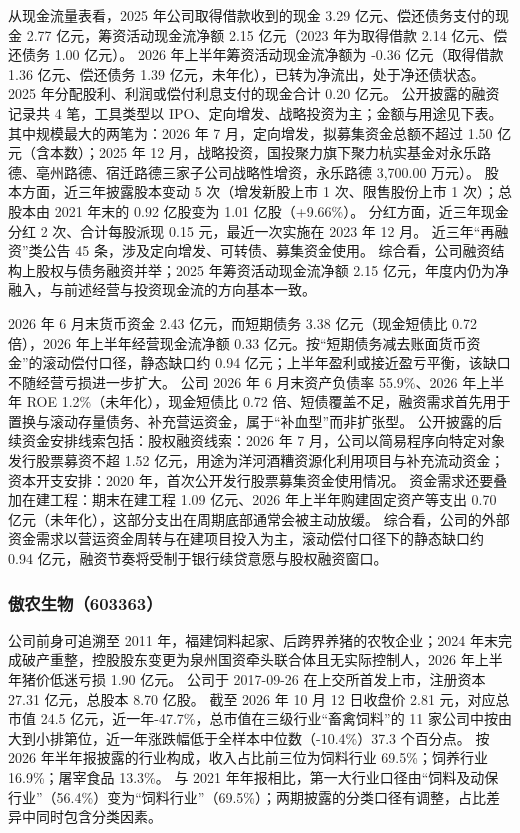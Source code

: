  从现金流量表看，2025 年公司取得借款收到的现金 3.29 亿元、偿还债务支付的现金 2.77 亿元，筹资活动现金流净额 2.15 亿元（2023 年为取得借款 2.14 亿元、偿还债务 1.00 亿元）。 2026 年上半年筹资活动现金流净额为 -0.36 亿元（取得借款 1.36 亿元、偿还债务 1.39 亿元，未年化），已转为净流出，处于净还债状态。 2025 年分配股利、利润或偿付利息支付的现金合计 0.20 亿元。 公开披露的融资记录共 4 笔，工具类型以 IPO、定向增发、战略投资为主；金额与用途见下表。 其中规模最大的两笔为：2026 年 7 月，定向增发，拟募集资金总额不超过 1.50 亿元（含本数）；2025 年 12 月，战略投资，国投聚力旗下聚力杭实基金对永乐路德、亳州路德、宿迁路德三家子公司战略性增资，永乐路德 3,700.00 万元）。 股本方面，近三年披露股本变动 5 次（增发新股上市 1 次、限售股份上市 1 次）；总股本由 2021 年末的 0.92 亿股变为 1.01 亿股（+9.66\%）。 分红方面，近三年现金分红 2 次、合计每股派现 0.15 元，最近一次实施在 2023 年 12 月。 近三年“再融资”类公告 45 条，涉及定向增发、可转债、募集资金使用。 综合看，公司融资结构上股权与债务融资并举；2025 年筹资活动现金流净额 2.15 亿元，年度内仍为净融入，与前述经营与投资现金流的方向基本一致。

 2026 年 6 月末货币资金 2.43 亿元，而短期债务 3.38 亿元（现金短债比 0.72 倍），2026 年上半年经营现金流净额 0.33 亿元。按“短期债务减去账面货币资金”的滚动偿付口径，静态缺口约 0.94 亿元；上半年盈利或接近盈亏平衡，该缺口不随经营亏损进一步扩大。 公司 2026 年 6 月末资产负债率 55.9\%、2026 年上半年 ROE 1.2\%（未年化），现金短债比 0.72 倍、短债覆盖不足，融资需求首先用于置换与滚动存量债务、补充营运资金，属于“补血型”而非扩张型。 公开披露的后续资金安排线索包括：股权融资线索：2026 年 7 月，公司以简易程序向特定对象发行股票募资不超 1.52 亿元，用途为洋河酒糟资源化利用项目与补充流动资金；资本开支安排：2020 年，首次公开发行股票募集资金使用情况。 资金需求还要叠加在建工程：期末在建工程 1.09 亿元、2026 年上半年购建固定资产等支出 0.70 亿元（未年化），这部分支出在周期底部通常会被主动放缓。 综合看，公司的外部资金需求以营运资金周转与在建项目投入为主，滚动偿付口径下的静态缺口约 0.94 亿元，融资节奏将受制于银行续贷意愿与股权融资窗口。




\subsubsection{傲农生物（603363）}
\label{co:603363}

 公司前身可追溯至 2011 年，福建饲料起家、后跨界养猪的农牧企业；2024 年末完成破产重整，控股股东变更为泉州国资牵头联合体且无实际控制人，2026 年上半年猪价低迷亏损 1.90 亿元。 公司于 2017-09-26 在上交所首发上市，注册资本 27.31 亿元，总股本 8.70 亿股。 截至 2026 年 10 月 12 日收盘价 2.81 元，对应总市值 24.5 亿元，近一年-47.7\%，总市值在三级行业“畜禽饲料”的 11 家公司中按由大到小排第位，近一年涨跌幅低于全样本中位数（-10.4\%）37.3 个百分点。 按 2026 年半年报披露的行业构成，收入占比前三位为饲料行业 69.5\%；饲养行业 16.9\%；屠宰食品 13.3\%。 与 2021 年年报相比，第一大行业口径由“饲料及动保行业”（56.4\%）变为“饲料行业”（69.5\%）；两期披露的分类口径有调整，占比差异中同时包含分类因素。

